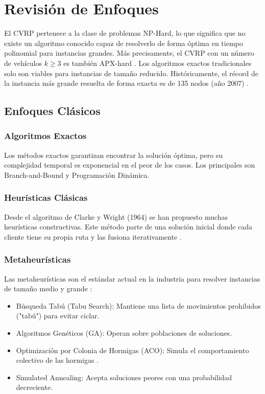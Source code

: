 \documentclass[a4paper, 11pt]{article}
\begin{document}
\section{Revisión de Enfoques}

El CVRP pertenece a la clase de problemas NP-Hard, lo que significa que no existe un algoritmo conocido capaz de resolverlo de forma óptima en tiempo polinomial para instancias grandes. Más precisamente, el CVRP con un número de vehículos $k\ge3$ es también APX-hard \cite{ref1}. Los algoritmos exactos tradicionales solo son viables para instancias de tamaño reducido. Históricamente, el récord de la instancia más grande resuelta de forma exacta es de 135 nodos (año 2007) \cite{ref5}. 

\subsection{Enfoques Clásicos}

\subsubsection{Algoritmos Exactos}
Los métodos exactos garantizan encontrar la solución óptima, pero su complejidad temporal es exponencial en el peor de los casos. Los principales son Branch-and-Bound y Programación Dinámica.

\subsubsection{Heurísticas Clásicas}
Desde el algoritmo de Clarke y Wright (1964) se han propuesto muchas heurísticas constructivas. Este método parte de una solución inicial donde cada cliente tiene su propia ruta y las fusiona iterativamente \cite{ref5}. 

\subsubsection{Metaheurísticas}
Las metaheurísticas son el estándar actual en la industria para resolver instancias de tamaño medio y grande \cite{ref5,ref6}:
\begin{itemize}
    \item Búsqueda Tabú (Tabu Search): Mantiene una lista de movimientos prohibidos ("tabú") para evitar ciclar.
    \item Algoritmos Genéticos (GA): Operan sobre poblaciones de soluciones.
    \item Optimización por Colonia de Hormigas (ACO): Simula el comportamiento colectivo de las hormigas \cite{ref6}.
    \item Simulated Annealing: Acepta soluciones peores con una probabilidad decreciente.
\end{itemize}
\end{document}
